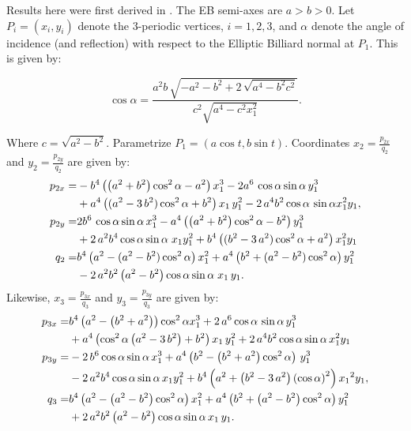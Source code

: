 Results here were first derived in \cite{garcia2019-incenter}. The EB semi-axes are $a>b>0$. Let $P_i=(x_i,y_i)$ denote the 3-periodic vertices, $i=1,2,3$, and $\alpha$ denote the angle of incidence (and reflection) with respect to the Elliptic Billiard normal at $P_1$. This is given by:
 
 $$\cos \alpha={\frac {a^2 b \, \sqrt {-{a}^{2}-{b}^{2}+2\,\sqrt {{a}^{4}-{b}^{2}{c}^{2}}}}{{c}^{2}\sqrt {{a}^{4}-{c}^{2} x_1^{2}}}}.$$

\noindent Where $c=\sqrt{a^2-b^2}$. Parametrize $P_1=(a\cos t, b\sin t)$. Coordinates $x_2=\frac{p_{2x}}{q_2}$ and $y_2=\frac{p_{2y}}{q_2}$ are given by:
{\small  
\begin{equation}\label{eq:p2} \aligned 
p_{2x}=&-{b}^{4} \left(  \left(   a^2+{b}^{2}\right)\cos^{2}\alpha   -{a}^{2}  \right) x_1^{3}-2{a}^{6} \,\cos  \alpha  \sin   \alpha  \, y_1^{3}\\
&+{a}^{4} \left(  ({a
}^{2}-3\, {b}^{2}) \cos^{2} \alpha  +{b}^{2}
 \right) {x_1}\,y_1^{2}-2\,{a}^{4}{b}^{2} \cos \alpha  \,\sin  \alpha    x_1^{2}{y_1},
\\
p_{2y}=& 2{b}^{6} \,\cos \alpha\sin \alpha\,   x_1^{3}-{
a}^{4}  \left(  \left(   a^2+{b}^{2}\right)\cos^{2}  \alpha  -{b}^{2}  \right)  y_1^{3}\\
&+  2\,{a}^{2} {b}^{4}\cos \alpha \sin
  \alpha \; {x_1} y_1^{2} +{b}^{4}\left(  ({b
 }^{2}-3\, {a}^{2}) \cos^{2} \alpha  +{a}^{2}
  \right) x_1^{2}{y_1}
\\
q_2=&{b}^{4} \left( a^2-(a^2-b^2)\cos^2  \alpha   \right)
x_1^{2}+{a}^{4} \left(  {b}^{2}+(a^2-b^2)\cos^2 \alpha  
 \right) y_1^{2}\\
 & - 2\, {a}^{2}{b}^{2} \left({a}^{2} -{b}^{2} \right)\cos \alpha\sin \alpha \; {x_1}\,{
y_1}.
\endaligned
%
\end{equation}
}
\noindent Likewise, $x_3=\frac{p_{3x}}{q_3}$ and $y_3=\frac{p_{3y}}{q_3}$ are given by:
{\small  
 \begin{equation} \label{eq:p3} \aligned 
p_{3x}=& {b}^{4} \left( {a}^{2}- \left( {b}^{2}+{a}^{2} \right) \right)
 \cos^{2}  \alpha   x_1^{3}+2\, {a}^{6} 
 \cos \alpha\,\sin \alpha\, y_1^{3}\\
 &+{a}^{4} \left( 
  \cos^{2}  \alpha  \left( {a}^{2}-3\,{b}^{2}
 \right) +{b}^{2} \right) { x_1}\, y_1^{2}+2\,{a}^{4}{b}^{2} \cos  \alpha \sin \alpha\,   x_1^{2}{ y_1}
\\
p_{3y}=& -2\, {b}^{6} \cos \alpha\sin \alpha\, x_1^{3}+
{a}^{4} \left( {b}^{2}- \left( {b}^{2}+{a}^{2} \right)   \cos^{2}  \alpha  \right)\,  y_1^{3}\\
& -2\,{a}^{2}  {b}^{4}\cos
 \alpha  \sin \alpha\,  x_1 y_1^{2}+
{b}^{4} \left( {a}^{2}+ \left( {b}^{2}-3\,{a}^{2} \right)  \left( \cos
 \alpha  \right) ^{2} \right) {{ x_1}}^{2}{ y_1},
\\
q_3=& {b}^{4} \left( {a}^{2}- \left(a^2 -{b}^{2}  \right)   \cos^{2} \alpha   \right) x_1^{2}+{a}^{4} \left( {b}^{2}+ \left( a^2-{b}^{2}  \right)  \cos^{2} \alpha  \right)  y_1^{2}\\
&+2\,{a}^{2}{b}^{
2} \left( {a}^{2}-{b}^{2} \right) \cos \alpha \sin \alpha\, { x_1}\,{ y_1}.
\endaligned
%
\end{equation}
}
 